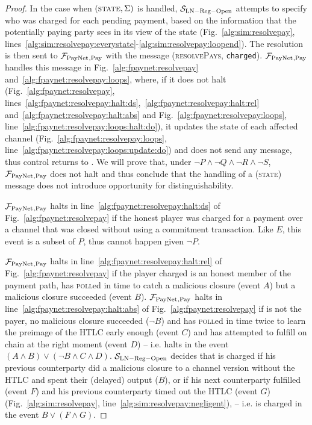 \begin{proof}
  In the case when $\left(\textsc{state}, \Sigma\right)$ is handled,
  $\mathcal{S}_{\mathrm{LN - Reg - Open}}$ attempts to specify who was charged
  for each pending payment, based on the information that the potentially paying
  party sees in its view of the \ledger{} state (Fig.~\ref{alg:sim:resolvepay},
  lines~\ref{alg:sim:resolvepay:everystate}-\ref{alg:sim:resolvepay:loopend}).
  The resolution is then sent to $\mathcal{F}_{\mathrm{PayNet}}{}_{\mathrm{, Pay}}$ with the message
  (\textsc{resolvePays}, \texttt{charged}). $\mathcal{F}_{\mathrm{PayNet}}{}_{\mathrm{, Pay}}$
  handles this message in Fig.~\ref{alg:fpaynet:resolvepay}
  and~\ref{alg:fpaynet:resolvepay:loops}, where, if it does not halt
  (Fig.~\ref{alg:fpaynet:resolvepay},
  lines~\ref{alg:fpaynet:resolvepay:halt:ds},~\ref{alg:fpaynet:resolvepay:halt:rel}
  and~\ref{alg:fpaynet:resolvepay:halt:abs} and
  Fig.~\ref{alg:fpaynet:resolvepay:loops},
  line~\ref{alg:fpaynet:resolvepay:loops:halt:do}), it updates the state of each
  affected channel (Fig.~\ref{alg:fpaynet:resolvepay:loops},
  line~\ref{alg:fpaynet:resolvepay:loops:update:do}) and does not send any
  message, thus control returns to \environment. We will prove that, under $\neg
  P \wedge \neg Q \wedge \neg R \wedge \neg S$, $\mathcal{F}_{\mathrm{PayNet}}{}_{\mathrm{, Pay}}$
  does not halt and thus conclude that the handling of a (\textsc{state})
  message does not introduce opportunity for distinguishability.

  $\mathcal{F}_{\mathrm{PayNet}}{}_{\mathrm{, Pay}}$ halts in
  line~\ref{alg:fpaynet:resolvepay:halt:ds} of
  Fig.~\ref{alg:fpaynet:resolvepay} if the honest player \dave{} was charged for
  a payment over a channel that was closed without using a commitment
  transaction. Like $E$, this event is a subset of $P$, thus cannot happen given
  $\neg P$.

  $\mathcal{F}_{\mathrm{PayNet}}{}_{\mathrm{, Pay}}$ halts in
  line~\ref{alg:fpaynet:resolvepay:halt:rel} of
  Fig.~\ref{alg:fpaynet:resolvepay} if the player \dave{} charged is an honest
  member of the payment path, has \textsc{poll}ed in time to catch a malicious
  closure (event $A$) but a malicious closure succeeded (event $B$).
  $\mathcal{F}_{\mathrm{PayNet}}{}_{\mathrm{, Pay}}$ halts in
  line~\ref{alg:fpaynet:resolvepay:halt:abs} of
  Fig.~\ref{alg:fpaynet:resolvepay} if \dave{} is not the payer, no malicious
  closure succeeded ($\neg B$) and \dave{} has \textsc{poll}ed in time twice to
  learn the preimage of the HTLC early enough (event $C$) and has attempted to
  fulfill on chain at the right moment (event $D$) -- i.e. halts in the event
  $(A \wedge B) \vee (\neg B \wedge C \wedge D)$. $\mathcal{S}_{\mathrm{LN - Reg
  - Open}}$ decides that \dave{} is charged if his previous counterparty did a
  malicious closure to a channel version without the HTLC and spent their
  (delayed) output ($B$), or if his next counterparty fulfilled (event $F$) and
  his previous counterparty timed out the HTLC (event $G$)
  (Fig.~\ref{alg:sim:resolvepay}, line~\ref{alg:sim:resolvepay:negligent}), --
  i.e. \dave{} is charged in the event $B \vee (F \wedge G)$.


\end{proof}
